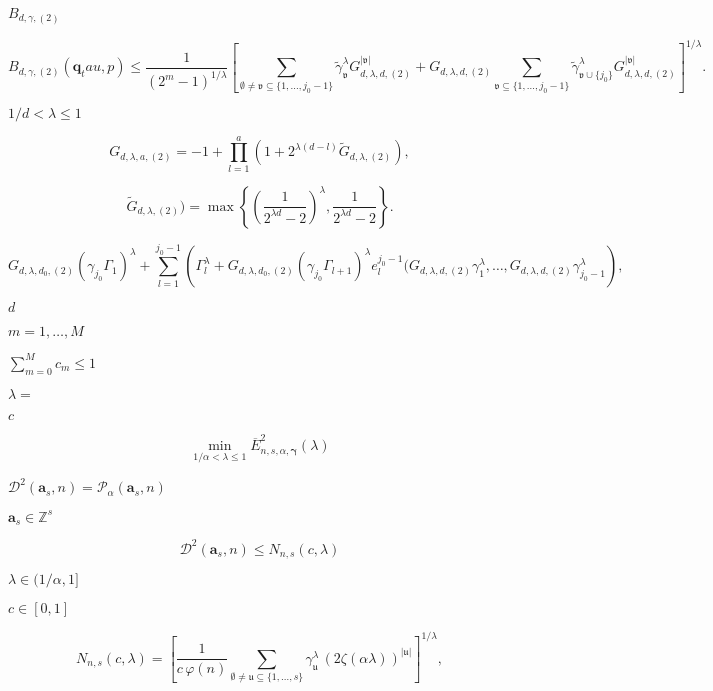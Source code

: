 \documentclass{article}
\begin{document}
$B_{d,  \gamma, (2)}$
\pagebreak

\[  B_{d,  \gamma, (2)}(\boldsymbol q_tau, p) \leq
  \frac{1}{(2^m - 1)^{1/\lambda}} 
  \left[
     \sum_{\emptyset \neq \mathfrak v \subseteq \{1, \dots, j_0 - 1 \}} 
        \tilde{\gamma}_{\mathfrak v}^\lambda G_{d, \lambda, d, (2)}^{|\mathfrak v|} +
     G_{d, \lambda, d, (2)} 
        \sum_{\mathfrak v \subseteq \{1, \dots, j_0 - 1 \}} \tilde{\gamma}_{\mathfrak v \cup \{j_0\}}^\lambda G_{d, \lambda, d, (2)}^{|\mathfrak v|}
  \right]^{1/\lambda}.
\]
\pagebreak

$1/d < \lambda \leq 1$
\pagebreak

\[   G_{d, \lambda, a, (2)} = - 1 + \prod_{l = 1}^{a}(1 + 2^{\lambda (d-l)}\tilde{G}_{d, \lambda, (2)}),
\]
\pagebreak

\[   \tilde{G}_{d, \lambda, (2)}) = \max \left\{ \left(\frac{1}{2^{\lambda d} - 2}\right)^{\lambda}, \frac{1}{2^{\lambda d} - 2} \right\}.
\]
\pagebreak

\[   G_{d, \lambda, d_0, (2)} (\gamma_{j_0} \Gamma_1)^\lambda + 
   \sum_{l = 1}^{j_0-1} \left(\Gamma_l^\lambda + G_{d, \lambda, d_0, (2)} (\gamma_{j_0} \Gamma_{l + 1})^\lambda 
   e_l^{j_0-1}(G_{d, \lambda, d, (2)} \gamma_1^\lambda, \dots, G_{d, \lambda, d, (2)} \gamma_{j_0-1}^\lambda\right),
\]
\pagebreak

$ d $
\pagebreak

$m=1,\dots,M$
\pagebreak

$\sum_{m=0}^M c_m \leq 1$
\pagebreak

$\lambda = $
\pagebreak

$ c $
\pagebreak

\[  \min_{1/\alpha < \lambda \leq 1} \overline{E}^2_{n,s,\alpha,\boldsymbol\gamma}(\lambda)
\]
\pagebreak

$\mathcal D^2(\boldsymbol a_s, n)
= \mathcal P_\alpha(\boldsymbol a_s, n)$
\pagebreak

$\boldsymbol a_s \in \mathbb Z^s$
\pagebreak

\[   \mathcal D^2(\boldsymbol a_s, n) \leq N_{n,s}(c, \lambda)
\]
\pagebreak

$\lambda \in (1/\alpha,1]$
\pagebreak

$c \in [0, 1]$
\pagebreak

\[   N_{n,s}(c, \lambda) =
   \left[
      \frac{1}{c \, \varphi(n)}
      \sum_{\emptyset \neq \mathfrak u \subseteq \{1,\dots,s\}}
      \gamma_{\mathfrak u}^\lambda \,
      \left( 2 \zeta(\alpha\lambda) \right)^{|\mathfrak u|}
   \right]^{1/\lambda},
\]
\pagebreak
\end{document}
